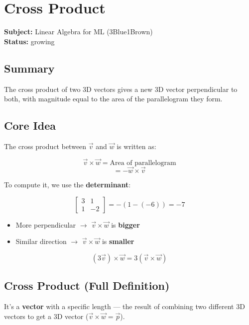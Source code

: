 \section{Cross Product}
\label{sec:cross-product}

\noindent\textbf{Subject:} Linear Algebra for ML (3Blue1Brown) \\
\textbf{Status:} growing

\subsection*{Summary}
The cross product of two 3D vectors gives a new 3D vector perpendicular to both, with magnitude equal to the area of the parallelogram they form.

\subsection{Core Idea}

The cross product between $\vec{v}$ and $\vec{w}$ is written as:

\[
\vec{v} \times \vec{w} = \text{Area of parallelogram}
\]
\[
= -\vec{w} \times \vec{v}
\]

To compute it, we use the \textbf{determinant}:

\[
\begin{bmatrix} 3 & 1 \\ 1 & -2 \end{bmatrix} = -(1 - (-6)) = -7
\]

\begin{itemize}[nosep]
  \item More perpendicular $\rightarrow$ $\vec{v} \times \vec{w}$ is \textbf{bigger}
  \item Similar direction $\rightarrow$ $\vec{v} \times \vec{w}$ is \textbf{smaller}
\end{itemize}

\[
(3\vec{v}) \times \vec{w} = 3(\vec{v} \times \vec{w})
\]

\subsection{Cross Product (Full Definition)}

\begin{defbox}
It's a \textbf{vector} with a specific length --- the result of combining two different 3D vectors to get a 3D vector ($\vec{v} \times \vec{w} = \vec{p}$).
\end{defbox}

